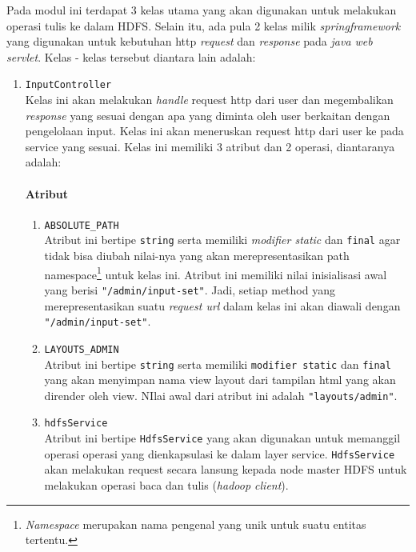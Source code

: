 Pada modul ini terdapat 3 kelas utama yang akan digunakan untuk melakukan operasi tulis ke dalam HDFS. Selain itu, ada pula 2 kelas milik \textit{springframework} yang digunakan untuk kebutuhan http \textit{request} dan \textit{response} pada \textit{java web servlet}. Kelas - kelas tersebut diantara lain adalah:
\begin{enumerate}
	\item \texttt{InputController}\\
	Kelas ini akan melakukan \textit{handle} request http dari user dan megembalikan \textit{response} yang sesuai dengan apa yang diminta oleh user berkaitan dengan pengelolaan input. Kelas ini akan meneruskan request http dari user ke pada service yang sesuai. Kelas ini memiliki 3 atribut dan 2 operasi, diantaranya adalah:
	
	\paragraph{Atribut}
		\begin{enumerate}
			\item \verb|ABSOLUTE_PATH|\\
			Atribut ini bertipe \texttt{string} serta memiliki \textit{modifier static} dan \texttt{final} agar tidak bisa diubah nilai-nya yang akan merepresentasikan path namespace\footnote{\textit{Namespace} merupakan nama pengenal yang unik untuk suatu entitas tertentu.} untuk kelas ini. Atribut ini memiliki nilai inisialisasi awal yang berisi \texttt{"/admin/input-set"}. Jadi, setiap method yang merepresentasikan suatu \textit{request url} dalam kelas ini akan diawali dengan \texttt{"/admin/input-set"}.

			\item \verb|LAYOUTS_ADMIN|\\
			Atribut ini bertipe \texttt{string} serta memiliki \texttt{modifier static} dan \texttt{final} yang akan menyimpan nama view layout dari tampilan html yang akan dirender oleh view. NIlai awal dari atribut ini adalah \texttt{"layouts/admin"}.

			\item \texttt{hdfsService}\\
			Atribut ini bertipe \texttt{HdfsService} yang akan digunakan untuk memanggil operasi operasi yang dienkapsulasi ke dalam layer service. \texttt{HdfsService} akan melakukan request secara lansung kepada node master HDFS untuk melakukan operasi baca dan tulis (\textit{hadoop client}).


\end{enumerate}
\end{enumerate}
